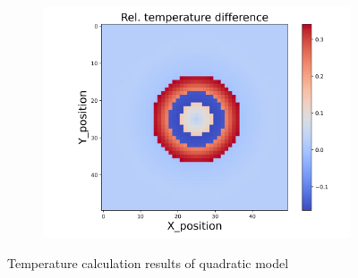 \begin{figure}[h]
\begin{minipage}{\textwidth}
\begin{subfigure}{0.325\textwidth}
            \centering
            \includegraphics[width=\textwidth]{figures/raw_data/33/quad/T_bias.jpg}
        \end{subfigure}
    \end{minipage}
    \caption{Temperature calculation results of quadratic model}  
\end{figure}
